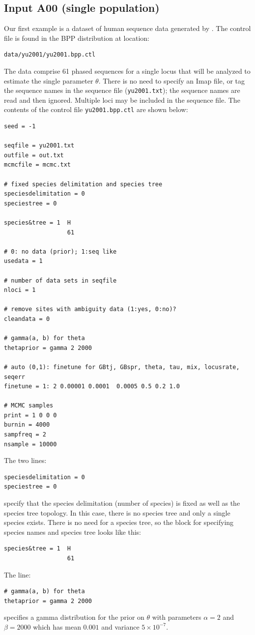 \documentclass{book}
\numberwithin{equation}{section} \renewcommand{\baselinestretch}{0.55}
\begin{document}
\subsection{Input A00 (single population)}
Our first example is a dataset of human sequence data generated by
\citet{Yu2001}. The control file is found in the BPP distribution at
location:
\begin{verbatim}
data/yu2001/yu2001.bpp.ctl
\end{verbatim}
The data comprise 61 phased sequences for a single locus that will be
analyzed to estimate the single parameter $\theta$.  There is no need
to specify an Imap file, or tag the sequence names in the sequence
file (\texttt{yu2001.txt}); the sequence names are read and then
ignored.  Multiple loci may be included in the sequence file. The
contents of the control file \texttt{yu2001.bpp.ctl} are shown below:

{\small
\begin{verbatim}
seed = -1

seqfile = yu2001.txt
outfile = out.txt
mcmcfile = mcmc.txt

# fixed species delimitation and species tree
speciesdelimitation = 0 
speciestree = 0

species&tree = 1  H
                  61  

# 0: no data (prior); 1:seq like
usedata = 1

# number of data sets in seqfile
nloci = 1    

# remove sites with ambiguity data (1:yes, 0:no)?
cleandata = 0    

# gamma(a, b) for theta
thetaprior = gamma 2 2000

# auto (0,1): finetune for GBtj, GBspr, theta, tau, mix, locusrate, seqerr
finetune = 1: 2 0.00001 0.0001  0.0005 0.5 0.2 1.0  

# MCMC samples
print = 1 0 0 0  
burnin = 4000
sampfreq = 2
nsample = 10000
\end{verbatim}
}
\noindent
The two lines:
\begin{verbatim}
speciesdelimitation = 0 
speciestree = 0
\end{verbatim}
specify that the species delimitation (number of species) is fixed as
well as the species tree topology. In this case,
there is no species tree and only a single species exists.  There is
no need for a species tree, so the block for specifying species names
and species tree looks like this:
\begin{verbatim}
species&tree = 1  H
                  61
\end{verbatim}
\noindent
The line:
\begin{verbatim}
# gamma(a, b) for theta
thetaprior = gamma 2 2000
\end{verbatim}
specifies a gamma distribution for the prior on $\theta$ with
parameters $\alpha = 2$ and $\beta = 2000$ which has mean $0.001$ and
variance $5 \times 10^{-7}$.
\end{document}
